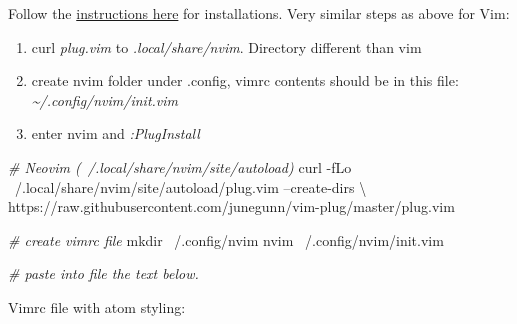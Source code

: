 \documentclass[]{article}
\newenvironment{Shaded}{\begin{snugshade}}{\end{snugshade}}
\newcommand{\CommentTok}[1]{\textcolor[rgb]{0.56,0.35,0.01}{\textit{#1}}}
\newcommand{\ExtensionTok}[1]{#1}
\newcommand{\FunctionTok}[1]{\textcolor[rgb]{0.00,0.00,0.00}{#1}}
\newcommand{\NormalTok}[1]{#1}
\providecommand{\tightlist}{%
  \setlength{\itemsep}{0pt}\setlength{\parskip}{0pt}}
\begin{document}
Follow the
\href{https://github.com/junegunn/vim-plug/wiki/tutorial}{instructions
here} for installations. Very similar steps as above for Vim:

\begin{enumerate}
\def\labelenumi{\arabic{enumi}.}
\tightlist
\item
  curl \emph{plug.vim} to \emph{.local/share/nvim}. Directory different
  than vim
\item
  create nvim folder under .config, vimrc contents should be in this
  file: \emph{\textasciitilde{}/.config/nvim/init.vim}
\item
  enter nvim and \emph{:PlugInstall}
\end{enumerate}

\begin{Shaded}
\begin{Highlighting}[]
\CommentTok{# Neovim (~/.local/share/nvim/site/autoload)}
\ExtensionTok{curl}\NormalTok{ -fLo ~/.local/share/nvim/site/autoload/plug.vim --create-dirs \textbackslash{}}
\NormalTok{    https://raw.githubusercontent.com/junegunn/vim-plug/master/plug.vim}

\CommentTok{# create vimrc file}
\FunctionTok{mkdir}\NormalTok{ ~/.config/nvim}
\ExtensionTok{nvim}\NormalTok{ ~/.config/nvim/init.vim}

\CommentTok{# paste into file the text below.}
\end{Highlighting}
\end{Shaded}

Vimrc file with atom styling:
\end{document}
